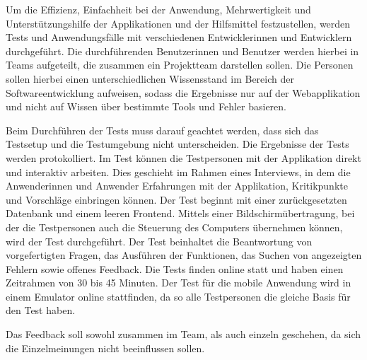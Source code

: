 Um die Effizienz, Einfachheit bei der Anwendung, Mehrwertigkeit und Unterstützungshilfe der Applikationen und der Hilfsmittel festzustellen, werden Tests und Anwendungsfälle mit verschiedenen Entwicklerinnen und Entwicklern durchgeführt. Die durchführenden Benutzerinnen und Benutzer werden hierbei in Teams aufgeteilt, die zusammen ein Projektteam darstellen sollen. Die Personen sollen hierbei einen unterschiedlichen Wissensstand im Bereich der Softwareentwicklung aufweisen, sodass die Ergebnisse nur auf der Webapplikation und nicht auf Wissen über bestimmte Tools und Fehler basieren. 

Beim Durchführen der Tests muss darauf geachtet werden, dass sich das Testsetup und die Testumgebung nicht unterscheiden. Die Ergebnisse der Tests werden protokolliert. Im Test können die Testpersonen mit der Applikation direkt und interaktiv arbeiten. Dies geschieht im Rahmen eines Interviews, in dem die Anwenderinnen und Anwender Erfahrungen mit der Applikation, Kritikpunkte und Vorschläge einbringen können. Der Test beginnt mit einer zurückgesetzten Datenbank und einem leeren Frontend. Mittels einer Bildschirmübertragung, bei der die Testpersonen auch die Steuerung des Computers übernehmen können, wird der Test durchgeführt.
Der Test beinhaltet die Beantwortung von vorgefertigten Fragen, das Ausführen der Funktionen, das Suchen von angezeigten Fehlern sowie offenes Feedback. Die Tests finden online statt und haben einen Zeitrahmen von 30 bis 45 Minuten. Der Test für die mobile Anwendung wird in einem Emulator online stattfinden, da so alle Testpersonen die gleiche Basis für den Test haben.

Das Feedback soll sowohl zusammen im Team, als auch einzeln geschehen, da sich die Einzelmeinungen nicht beeinflussen sollen.
